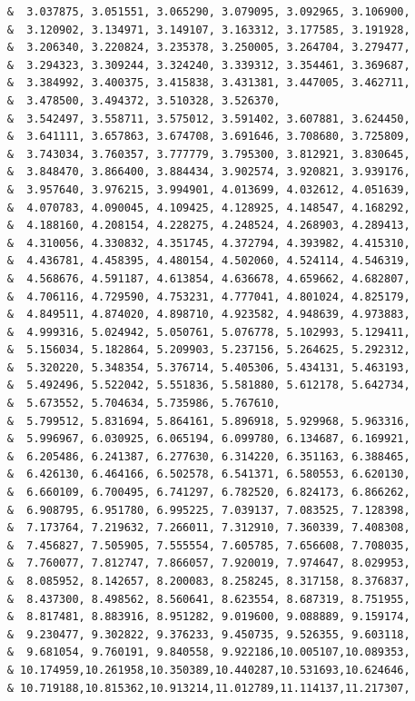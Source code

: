 \begin{lstlisting}
     &  3.037875, 3.051551, 3.065290, 3.079095, 3.092965, 3.106900,
     &  3.120902, 3.134971, 3.149107, 3.163312, 3.177585, 3.191928,
     &  3.206340, 3.220824, 3.235378, 3.250005, 3.264704, 3.279477,
     &  3.294323, 3.309244, 3.324240, 3.339312, 3.354461, 3.369687,
     &  3.384992, 3.400375, 3.415838, 3.431381, 3.447005, 3.462711,
     &  3.478500, 3.494372, 3.510328, 3.526370,
     &  3.542497, 3.558711, 3.575012, 3.591402, 3.607881, 3.624450,
     &  3.641111, 3.657863, 3.674708, 3.691646, 3.708680, 3.725809,
     &  3.743034, 3.760357, 3.777779, 3.795300, 3.812921, 3.830645,
     &  3.848470, 3.866400, 3.884434, 3.902574, 3.920821, 3.939176,
     &  3.957640, 3.976215, 3.994901, 4.013699, 4.032612, 4.051639,
     &  4.070783, 4.090045, 4.109425, 4.128925, 4.148547, 4.168292,
     &  4.188160, 4.208154, 4.228275, 4.248524, 4.268903, 4.289413,
     &  4.310056, 4.330832, 4.351745, 4.372794, 4.393982, 4.415310,
     &  4.436781, 4.458395, 4.480154, 4.502060, 4.524114, 4.546319,
     &  4.568676, 4.591187, 4.613854, 4.636678, 4.659662, 4.682807,
     &  4.706116, 4.729590, 4.753231, 4.777041, 4.801024, 4.825179,
     &  4.849511, 4.874020, 4.898710, 4.923582, 4.948639, 4.973883,
     &  4.999316, 5.024942, 5.050761, 5.076778, 5.102993, 5.129411,
     &  5.156034, 5.182864, 5.209903, 5.237156, 5.264625, 5.292312,
     &  5.320220, 5.348354, 5.376714, 5.405306, 5.434131, 5.463193,
     &  5.492496, 5.522042, 5.551836, 5.581880, 5.612178, 5.642734,
     &  5.673552, 5.704634, 5.735986, 5.767610,
     &  5.799512, 5.831694, 5.864161, 5.896918, 5.929968, 5.963316,
     &  5.996967, 6.030925, 6.065194, 6.099780, 6.134687, 6.169921,
     &  6.205486, 6.241387, 6.277630, 6.314220, 6.351163, 6.388465,
     &  6.426130, 6.464166, 6.502578, 6.541371, 6.580553, 6.620130,
     &  6.660109, 6.700495, 6.741297, 6.782520, 6.824173, 6.866262,
     &  6.908795, 6.951780, 6.995225, 7.039137, 7.083525, 7.128398,
     &  7.173764, 7.219632, 7.266011, 7.312910, 7.360339, 7.408308,
     &  7.456827, 7.505905, 7.555554, 7.605785, 7.656608, 7.708035,
     &  7.760077, 7.812747, 7.866057, 7.920019, 7.974647, 8.029953,
     &  8.085952, 8.142657, 8.200083, 8.258245, 8.317158, 8.376837,
     &  8.437300, 8.498562, 8.560641, 8.623554, 8.687319, 8.751955,
     &  8.817481, 8.883916, 8.951282, 9.019600, 9.088889, 9.159174,
     &  9.230477, 9.302822, 9.376233, 9.450735, 9.526355, 9.603118,
     &  9.681054, 9.760191, 9.840558, 9.922186,10.005107,10.089353,
     & 10.174959,10.261958,10.350389,10.440287,10.531693,10.624646,
     & 10.719188,10.815362,10.913214,11.012789,11.114137,11.217307,

\end{lstlisting}
